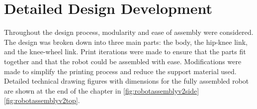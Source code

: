 \newpage
\section{Detailed Design Development}
Throughout the design process, modularity and ease of assembly were considered.
The design was broken down into three main parts: the body, the hip-knee link, and the knee-wheel link.
Print iterations were made to ensure that the parts fit together and that the robot could be assembled with ease.
Modifications were made to simplify the printing process and reduce the support material used.
Detailed technical drawing figures with dimensions for the fully assembled robot are shown at the end of the chapter in \ref{fig:robotassemblyv2side} \ref{fig:robotassemblyv2top}.


